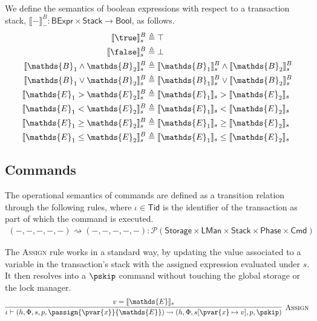 We define the semantics of boolean expressions with respect to a transaction stack, $\llbracket - \rrbracket_-^B : \mathsf{BExpr} \times \mathsf{Stack} \rightarrow \mathsf{Bool}$, as follows.
\begin{align*}
\llbracket \true \rrbracket_s^B &\triangleq \top \\
\llbracket \false \rrbracket_s^B &\triangleq \bot \\
\llbracket \mathds{B}_1 \land \mathds{B}_2 \rrbracket_s^B &\triangleq \llbracket \mathds{B}_1 \rrbracket_s^B \land \llbracket \mathds{B}_2 \rrbracket_s^B \\
\llbracket \mathds{B}_1 \lor \mathds{B}_2 \rrbracket_s^B &\triangleq \llbracket \mathds{B}_1 \rrbracket_s^B \lor \llbracket \mathds{B}_2 \rrbracket_s^B \\
\llbracket \mathds{E}_1 > \mathds{E}_2 \rrbracket_s^B &\triangleq \llbracket \mathds{E}_1 \rrbracket_s > \llbracket \mathds{E}_2 \rrbracket_s \\
\llbracket \mathds{E}_1 < \mathds{E}_2 \rrbracket_s^B &\triangleq \llbracket \mathds{E}_1 \rrbracket_s < \llbracket \mathds{E}_2 \rrbracket_s \\
\llbracket \mathds{E}_1 \geq \mathds{E}_2 \rrbracket_s^B &\triangleq \llbracket \mathds{E}_1 \rrbracket_s \geq \llbracket \mathds{E}_2 \rrbracket_s \\
\llbracket \mathds{E}_1 \leq \mathds{E}_2 \rrbracket_s^B &\triangleq \llbracket \mathds{E}_1 \rrbracket_s \leq \llbracket \mathds{E}_2 \rrbracket_s \\
\end{align*}

\subsection{Commands}

The operational semantics of commands are defined as a transition relation through the following rules, where $\iota \in \mathsf{Tid}$ is the identifier of the transaction as part of which the command is executed.
\begin{gather*}
(-, -, -, -, -) \rightsquigarrow (-, -, -, -, -) 
: \mathcal{P}(\mathsf{Storage} \times \mathsf{LMan} \times \mathsf{Stack} \times \mathsf{Phase} \times \mathsf{Cmd})
\end{gather*}

The \textsc{Assign} rule works in a standard way, by updating the value associated to a variable in the transaction's stack with the assigned expression evaluated under $s$. It then resolves into a $\pskip$ command without touching the global storage or the lock manager.
\[
\infer[\textsc{Assign}]
{
	\iota \vdash (h, \Phi, s, p, \passign{\pvar{x}}{\mathds{E}})
	\rightsquigarrow
	(h, \Phi, s[\pvar{x} \mapsto v], p, \pskip)
}
{
	v = \llbracket \mathds{E} \rrbracket_s
}
\]

